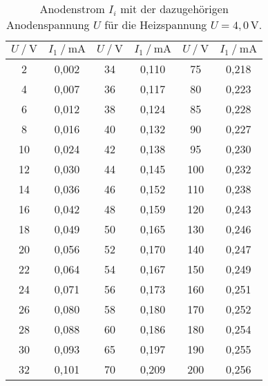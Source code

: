 \begin{table}[H]
    \centering
    \caption{Anodenstrom $I_i$ mit der dazugehörigen Anodenspannung $U$ für die Heizspannung $U = 4,0 \, \unit{\volt} $.}
    \label{tab:kennlini1_3}
    \begin{tabular}{S S S S S[table-format=3.1] S}
      \toprule
      {$U \mathbin{/} \unit{\volt}$} & {$I_1 \mathbin{/} \unit{\milli\ampere}$} & {$U \mathbin{/} \unit{\volt}$} & {$I_1 \mathbin{/} \unit{\milli\ampere}$} & {$U \mathbin{/} \unit{\volt}$} & {$I_1 \mathbin{/} \unit{\milli\ampere}$}  \\
      \midrule
        {2}  &    { 0,002} & {34}  &    {0,110} & {75 }    & {0,218} \\
        {4}  &    { 0,007} & {36}  &    {0,117} & {80 }    & {0,223} \\
        {6}  &    { 0,012} & {38}  &    {0,124} & {85 }    & {0,228} \\
        {8}  &    { 0,016} & {40}  &    {0,132} & {90 }    & {0,227} \\
        {10}  &    {0,024} & {42}  &    {0,138} & {95 }    & {0,230} \\
        {12}  &    {0,030} & {44}  &    {0,145} & {100}    & {0,232} \\
        {14}  &    {0,036} & {46}  &    {0,152} & {110}    & {0,238} \\
        {16}  &    {0,042} & {48}  &    {0,159} & {120}    & {0,243} \\
        {18}  &    {0,049} & {50}  &    {0,165} & {130}    & {0,246} \\
        {20}  &    {0,056} & {52}  &    {0,170} & {140}    & {0,247} \\
        {22}  &    {0,064} & {54}  &    {0,167} & {150}    & {0,249} \\
        {24}  &    {0,071} & {56}  &    {0,173} & {160}    & {0,251} \\
        {26}  &    {0,080} & {58}  &    {0,180} & {170}    & {0,252} \\
        {28}  &    {0,088} & {60}  &    {0,186} & {180}    & {0,254} \\
        {30}  &    {0,093} & {65}  &    {0,197} & {190}    & {0,255} \\
        {32}  &    {0,101} & {70}  &    {0,209} & {200}    & {0,256} \\
      \bottomrule
    \end{tabular}
\end{table}


